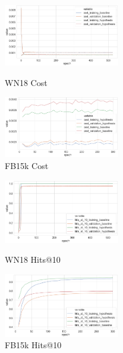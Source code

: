 \begin{figure}[H]
	\parbox{.5\linewidth}{
   		\centering
    		\includegraphics[width=0.45\textwidth, height=0.2\textheight]{WN18_Cost_Results}
		\caption{WN18 Cost}
		}
	\hfill
	\parbox{.5\linewidth}{
   		\centering
		\includegraphics[width=0.45\textwidth, height=0.2\textheight]{FB15k_Cost_Results}
		\caption{FB15k Cost}
		}
\end{figure}



\begin{figure}[H]
	\parbox{.5\linewidth}{
   		\centering
    		\includegraphics[width=0.45\textwidth, height=0.2\textheight]{WN18_hits_at_10_Results}
		\caption{WN18 Hits@10}
		}
	\hfill
	\parbox{.5\linewidth}{
   		\centering
		\includegraphics[width=0.45\textwidth, height=0.2\textheight]{FB15k_hits_at_10_Results}
		\caption{FB15k Hits@10}
		}
\end{figure}


